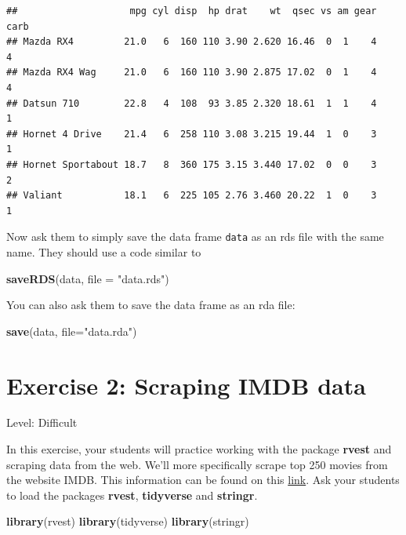 \documentclass[]{book}
\newenvironment{Shaded}{\begin{snugshade}}{\end{snugshade}}
\newcommand{\DataTypeTok}[1]{\textcolor[rgb]{0.13,0.29,0.53}{#1}}
\newcommand{\KeywordTok}[1]{\textcolor[rgb]{0.13,0.29,0.53}{\textbf{#1}}}
\newcommand{\NormalTok}[1]{#1}
\newcommand{\StringTok}[1]{\textcolor[rgb]{0.31,0.60,0.02}{#1}}
\begin{document}
\begin{verbatim}
##                    mpg cyl disp  hp drat    wt  qsec vs am gear carb
## Mazda RX4         21.0   6  160 110 3.90 2.620 16.46  0  1    4    4
## Mazda RX4 Wag     21.0   6  160 110 3.90 2.875 17.02  0  1    4    4
## Datsun 710        22.8   4  108  93 3.85 2.320 18.61  1  1    4    1
## Hornet 4 Drive    21.4   6  258 110 3.08 3.215 19.44  1  0    3    1
## Hornet Sportabout 18.7   8  360 175 3.15 3.440 17.02  0  0    3    2
## Valiant           18.1   6  225 105 2.76 3.460 20.22  1  0    3    1
\end{verbatim}

Now ask them to simply save the data frame \texttt{data} as an rds file with the same name. They should use a code similar to

\begin{Shaded}
\begin{Highlighting}[]
\KeywordTok{saveRDS}\NormalTok{(data, }\DataTypeTok{file =} \StringTok{"data.rds"}\NormalTok{)}
\end{Highlighting}
\end{Shaded}

You can also ask them to save the data frame as an rda file:

\begin{Shaded}
\begin{Highlighting}[]
\KeywordTok{save}\NormalTok{(data, }\DataTypeTok{file=}\StringTok{"data.rda"}\NormalTok{)}
\end{Highlighting}
\end{Shaded}

\hypertarget{exercise-2-scraping-imdb-data}{%
\section*{Exercise 2: Scraping IMDB data}\label{exercise-2-scraping-imdb-data}}

Level: Difficult

In this exercise, your students will practice working with the package \textbf{rvest} and scraping data from the web. We'll more specifically scrape top 250 movies from the website IMDB. This information can be found on this \href{https://www.imdb.com/search/title?genres=drama\&groups=top_250\&sort=user_rating}{link}. Ask your students to load the packages \textbf{rvest}, \textbf{tidyverse} and \textbf{stringr}.

\begin{Shaded}
\begin{Highlighting}[]
\KeywordTok{library}\NormalTok{(rvest)}
\KeywordTok{library}\NormalTok{(tidyverse)}
\KeywordTok{library}\NormalTok{(stringr)}
\end{Highlighting}
\end{Shaded}
\end{document}
